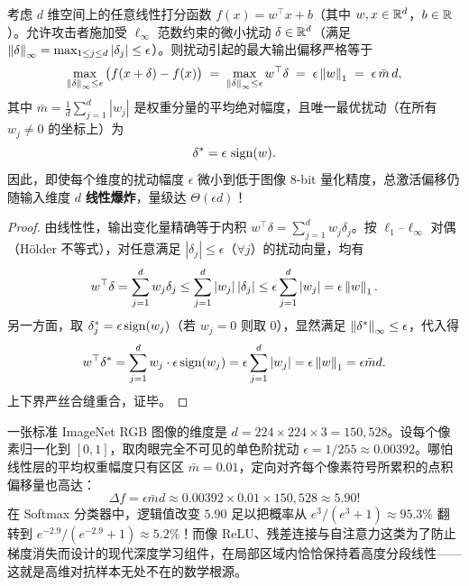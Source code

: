 \begin{thmBox}
\begin{theorem}\label{thm:linear-vuln}
考虑 $d$ 维空间上的任意线性打分函数 $f(x) = w^\top x + b$（其中 $w, x \in \mathbb{R}^d$，$b \in \mathbb{R}$）。允许攻击者施加受 $\ell_\infty$ 范数约束的微小扰动 $\delta \in \mathbb{R}^d$（满足 $\left\|\delta\right\|_\infty = \max_{1\le j\le d} |\delta_j| \le \epsilon$）。则扰动引起的最大输出偏移严格等于
\begin{equation}\label{eq:linear-vuln}
  \max_{\left\|\delta\right\|_\infty \le \epsilon} \big(f(x + \delta) - f(x)\big)
  \;=\; \max_{\left\|\delta\right\|_\infty \le \epsilon} w^\top \delta
  \;=\; \epsilon \left\|w\right\|_1 \;=\; \epsilon\,\bar{m}\, d,
\end{equation}
其中 $\bar{m} = \frac{1}{d}\sum_{j=1}^d |w_j|$ 是权重分量的平均绝对幅度，且唯一最优扰动（在所有 $w_j \neq 0$ 的坐标上）为
\[
  \delta^* = \epsilon\,\operatorname{sign}(w).
\]
因此，即使每个维度的扰动幅度 $\epsilon$ 微小到低于图像 8-bit 量化精度，总激活偏移仍随输入维度 $d$ \textbf{线性爆炸}，量级达 $\Theta(\epsilon d)$！
\end{theorem}
\end{thmBox}

\begin{proof}
由线性性，输出变化量精确等于内积 $w^\top \delta = \sum_{j=1}^d w_j \delta_j$。按 $\ell_1$--$\ell_\infty$ 对偶（H\"older 不等式），对任意满足 $|\delta_j| \le \epsilon$（$\forall j$）的扰动向量，均有
\[
  w^\top \delta = \sum_{j=1}^d w_j \delta_j
  \le \sum_{j=1}^d |w_j|\,|\delta_j|
  \le \epsilon \sum_{j=1}^d |w_j|
  = \epsilon \left\|w\right\|_1.
\]
另一方面，取 $\delta^*_j = \epsilon \operatorname{sign}(w_j)$（若 $w_j = 0$ 则取 $0$），显然满足 $\left\|\delta^*\right\|_\infty \le \epsilon$，代入得
\[
  w^\top \delta^* = \sum_{j=1}^d w_j \cdot \epsilon \operatorname{sign}(w_j) = \epsilon \sum_{j=1}^d |w_j| = \epsilon \left\|w\right\|_1 = \epsilon \bar{m} d.
\]
上下界严丝合缝重合，证毕。
\end{proof}

\begin{example}\label{ex:highdim-calc}
一张标准 ImageNet RGB 图像的维度是 $d = 224 \times 224 \times 3 = 150{,}528$。设每个像素归一化到 $[0,1]$，取肉眼完全不可见的单色阶扰动 $\epsilon = 1/255 \approx 0.00392$。哪怕线性层的平均权重幅度只有区区 $\bar{m} = 0.01$，定向对齐每个像素符号所累积的点积偏移量也高达：
\[
  \Delta f = \epsilon \bar{m} d \approx 0.00392 \times 0.01 \times 150{,}528 \approx 5.90!
\]
在 Softmax 分类器中，逻辑值改变 $5.90$ 足以把概率从 $e^{3}/(e^{3}+1) \approx 95.3\%$ 翻转到 $e^{-2.9}/(e^{-2.9}+1) \approx 5.2\%$！而像 ReLU、残差连接与自注意力这类为了防止梯度消失而设计的现代深度学习组件，在局部区域内恰恰保持着高度分段线性——这就是高维对抗样本无处不在的数学根源。
\end{example}

